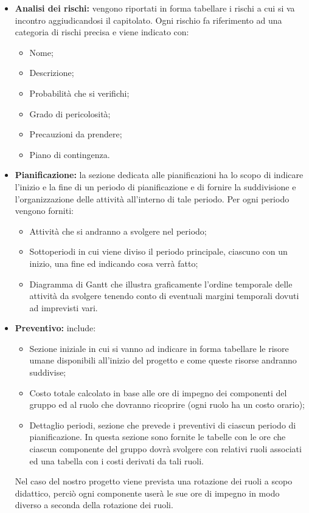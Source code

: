 \begin{itemize}
\item \textbf{Analisi dei rischi:} vengono riportati in forma tabellare i rischi a cui si va incontro aggiudicandosi il capitolato.
Ogni rischio fa riferimento ad una categoria di rischi precisa e viene indicato con:
\begin{itemize}
    \item Nome;
    \item Descrizione;
    \item Probabilità che si verifichi;
    \item Grado di pericolosità;
    \item Precauzioni da prendere;
    \item Piano di contingenza.
\end{itemize}
\item \textbf{Pianificazione:} la sezione dedicata alle pianificazioni ha lo scopo di indicare l'inizio e la fine di un periodo di pianificazione e 
di fornire la suddivisione e l'organizzazione delle attività all'interno di tale periodo. Per ogni periodo vengono forniti:
\begin{itemize}
    \item Attività che si andranno a svolgere nel periodo;
    \item Sottoperiodi in cui viene diviso il periodo principale, ciascuno con un inizio, una fine ed indicando cosa verrà fatto;
    \item Diagramma di Gantt che illustra graficamente l'ordine temporale delle attività da svolgere tenendo conto di 
    eventuali margini temporali dovuti ad imprevisti vari.
\end{itemize}

\item \textbf{Preventivo:} include: 
\begin{itemize}
    \item Sezione iniziale in cui si vanno ad indicare in forma tabellare le risore umane disponibili all'inizio del progetto e 
    come queste risorse andranno suddivise;
    \item Costo totale calcolato in base alle ore di impegno dei componenti del gruppo ed al ruolo che dovranno ricoprire (ogni ruolo ha un costo orario);
    \item Dettaglio periodi, sezione che prevede i preventivi di ciascun periodo di pianificazione.
    In questa sezione sono fornite le tabelle con le ore che ciascun componente del gruppo dovrà svolgere con relativi ruoli associati ed una tabella con i costi
    derivati da tali ruoli.
\end{itemize}
Nel caso del nostro progetto viene prevista una rotazione dei ruoli a scopo didattico, perciò ogni componente userà le sue ore di impegno in modo diverso 
a seconda della rotazione dei ruoli.
\end{itemize}